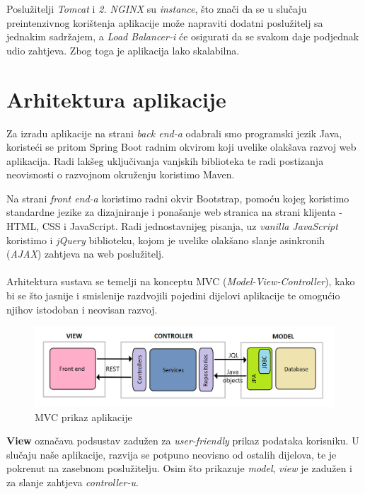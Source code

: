 		Poslužitelji \textit{Tomcat} i \textit{2. NGINX} su \textit{instance}, što znači da se u slučaju preintenzivnog korištenja aplikacije može napraviti dodatni poslužitelj sa jednakim sadržajem, a \textit{Load Balancer-i} će osigurati da se svakom daje podjednak udio zahtjeva. Zbog toga je aplikacija lako skalabilna.
		
		\section{Arhitektura aplikacije}
		Za izradu aplikacije na strani \textit{back end-a} odabrali smo programski jezik Java, koristeći se pritom Spring Boot radnim okvirom koji uvelike olakšava razvoj web aplikacija. Radi lakšeg uključivanja vanjskih biblioteka te radi postizanja neovisnosti o razvojnom okruženju koristimo Maven.
		
		Na strani \textit{front end-a} koristimo radni okvir Bootstrap, pomoću kojeg koristimo standardne jezike za dizajniranje i ponašanje web stranica na strani klijenta - HTML, CSS i JavaScript. Radi jednostavnijeg pisanja, uz \textit{vanilla JavaScript} koristimo i \textit{jQuery} biblioteku, kojom je uvelike olakšano slanje asinkronih (\textit{AJAX}) zahtjeva na web poslužitelj.\\
		\\
		Arhitektura sustava se temelji na konceptu MVC (\textit{Model-View-Controller}), kako bi se što jasnije i smislenije razdvojili pojedini dijelovi aplikacije te omogućio njihov istodoban i neovisan razvoj. 
		\begin{figure}[H]
			\includegraphics[scale=0.4]{figures/MVC.png}
			\centering
			\caption{MVC prikaz aplikacije}
			\label{fig:mvc}
		\end{figure}
		
		\textbf{View} označava podsustav zadužen za \textit{user-friendly} prikaz podataka korisniku. U slučaju naše aplikacije, razvija se potpuno neovisno od ostalih dijelova, te je pokrenut na zasebnom poslužitelju. Osim što prikazuje \textit{model}, \textit{view} je zadužen i za slanje zahtjeva \textit{controller-u}. 
		
